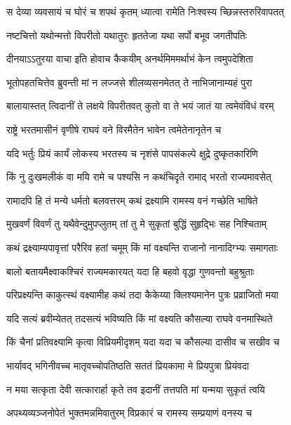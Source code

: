 \twolineshloka
{स देव्या व्यवसायं च घोरं च शपथं कृतम्}
{ध्यात्वा रामेति निःश्वस्य च्छिन्नस्तरुरिवापतत्} %

\twolineshloka
{नष्टचित्तो यथोन्मत्तो विपरीतो यथातुरः}
{हृततेजा यथा सर्पो बभूव जगतीपतिः} %

\twolineshloka
{दीनयाऽऽतुरया वाचा इति होवाच कैकयीम्}
{अनर्थमिममर्थाभं केन त्वमुपदेशिता} %

\twolineshloka
{भूतोपहतचित्तेव ब्रुवन्ती मां न लज्जसे}
{शीलव्यसनमेतत् ते नाभिजानाम्यहं पुरा} %

\twolineshloka
{बालायास्तत् त्विदानीं ते लक्षये विपरीतवत्}
{कुतो वा ते भयं जातं या त्वमेवंविधं वरम्} %

\twolineshloka
{राष्ट्रे भरतमासीनं वृणीषे राघवं वने}
{विरमैतेन भावेन त्वमेतेनानृतेन च} %

\twolineshloka
{यदि भर्तुः प्रियं कार्यं लोकस्य भरतस्य च}
{नृशंसे पापसंकल्पे क्षुद्रे दुष्कृतकारिणि} %

\twolineshloka
{किं नु दुःखमलीकं वा मयि रामे च पश्यसि}
{न कथंचिदृते रामाद् भरतो राज्यमावसेत्} %

\twolineshloka
{रामादपि हि तं मन्ये धर्मतो बलवत्तरम्}
{कथं द्रक्ष्यामि रामस्य वनं गच्छेति भाषिते} %

\twolineshloka
{मुखवर्णं विवर्णं तु यथैवेन्दुमुपप्लुतम्}
{तां तु मे सुकृतां बुद्धिं सुहृद्भिः सह निश्चिताम्} %

\twolineshloka
{कथं द्रक्ष्याम्यपावृत्तां परैरिव हतां चमूम्}
{किं मां वक्ष्यन्ति राजानो नानादिग्भ्यः समागताः} %

\twolineshloka
{बालो बतायमैक्ष्वाकश्चिरं राज्यमकारयत्}
{यदा हि बहवो वृद्धा गुणवन्तो बहुश्रुताः} %

\twolineshloka
{परिप्रक्ष्यन्ति काकुत्स्थं वक्ष्यामीह कथं तदा}
{कैकेय्या क्लिश्यमानेन पुत्रः प्रव्राजितो मया} %

\twolineshloka
{यदि सत्यं ब्रवीम्येतत् तदसत्यं भविष्यति}
{किं मां वक्ष्यति कौसल्या राघवे वनमास्थिते} %

\twolineshloka
{किं चैनां प्रतिवक्ष्यामि कृत्वा विप्रियमीदृशम्}
{यदा यदा च कौसल्या दासीव च सखीव च} %

\twolineshloka
{भार्यावद् भगिनीवच्च मातृवच्चोपतिष्ठति}
{सततं प्रियकामा मे प्रियपुत्रा प्रियंवदा} %

\twolineshloka
{न मया सत्कृता देवी सत्कारार्हा कृते तव}
{इदानीं तत्तपति मां यन्मया सुकृतं त्वयि} %

\twolineshloka
{अपथ्यव्यञ्जनोपेतं भुक्तमन्नमिवातुरम्}
{विप्रकारं च रामस्य सम्प्रयाणं वनस्य च} %

